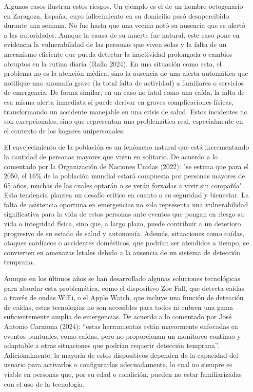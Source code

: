 Algunos casos ilustran estos riesgos. Un ejemplo es el de un hombre octogenario en Zaragoza, España, cuyo fallecimiento en su domicilio pasó desapercibido durante una semana. No fue hasta que una vecina notó su ausencia que se alertó a las autoridades. Aunque la causa de su muerte fue natural, este caso pone en evidencia la vulnerabilidad de las personas que viven solas y la falta de un mecanismo eficiente que pueda detectar la inactividad prolongada o cambios abruptos en la rutina diaria (Ralla 2024). En una situación como esta, el problema no es la atención médica, sino la ausencia de una alerta automática que notifique una anomalía grave (la total falta de actividad) a familiares o servicios de emergencia. De forma similar, en un caso no fatal como una caída, la falta de esa misma alerta inmediata sí puede derivar en graves complicaciones físicas, transformando un accidente manejable en una crisis de salud. Estos incidentes no son excepcionales, sino que representan una problemática real, especialmente en el contexto de los hogares unipersonales.

El envejecimiento de la población es un fenómeno natural que está incrementando la cantidad de personas mayores que viven en solitario. De acuerdo a lo comentado por la Organización de Naciones Unidas (2022): "se estima que para el 2050, el 16\% de la población mundial estará compuesta por personas mayores de 65 años, muchas de las cuales optarán o se verán forzadas a vivir sin compañía". Esta tendencia plantea un desafío crítico en cuanto a su seguridad y bienestar. La falta de asistencia oportuna en emergencias no solo representa una vulnerabilidad significativa para la vida de estas personas ante eventos que pongan en riesgo su vida o integridad física, sino que, a largo plazo, puede contribuir a un deterioro progresivo de su estado de salud y autonomía. Además, situaciones como caídas, ataques cardíacos o accidentes domésticos, que podrían ser atendidos a tiempo, se convierten en amenazas letales debido a la ausencia de un sistema de detección temprana.

Aunque en los últimos años se han desarrollado algunas soluciones tecnológicas para abordar esta problemática, como el dispositivo Zoe Fall, que detecta caídas a través de ondas WiFi, o el Apple Watch, que incluye una función de detección de caídas, estas tecnologías no son accesibles para todos ni cubren una gama suficientemente amplia de emergencias. De acuerdo a lo comentado por José Antonio Carmona (2024): ``estas herramientas están mayormente enfocadas en eventos puntuales, como caídas, pero no proporcionan un monitoreo continuo y adaptable a otras situaciones que podrían requerir detección temprana''. Adicionalmente, la mayoría de estos dispositivos dependen de la capacidad del usuario para activarlos o configurarlos adecuadamente, lo cual no siempre es viable en personas que, por su edad o condición, pueden no estar familiarizadas con el uso de la tecnología.

